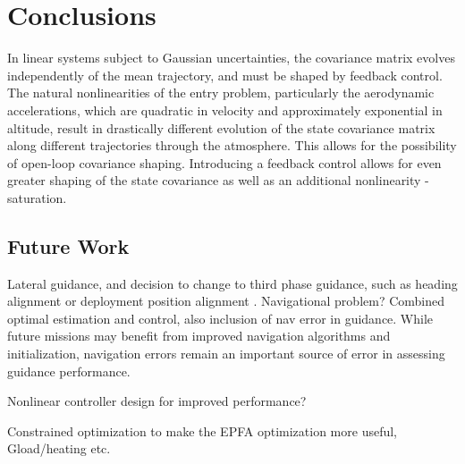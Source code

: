 \chapter{Conclusions}

In linear systems subject to Gaussian uncertainties, the covariance matrix evolves independently of the mean trajectory, and must be shaped by feedback control. The natural nonlinearities of the entry problem, particularly the aerodynamic accelerations, which are quadratic in velocity and approximately exponential in altitude, result in drastically different evolution of the state covariance matrix along different trajectories through the atmosphere. This allows for the possibility of open-loop covariance shaping. Introducing a feedback control allows for even greater shaping of the state covariance as well as an additional nonlinearity - saturation. 

\section{Future Work}
Lateral guidance, and decision to change to third phase guidance, such as heading alignment or deployment position alignment \cite{GuangfeiDissertation}.
Navigational problem? Combined optimal estimation and control, also inclusion of nav error in guidance. While future missions may benefit from improved navigation algorithms and initialization, navigation errors remain an important source of error in assessing guidance performance. 

Nonlinear controller design for improved performance? 

Constrained optimization to make the EPFA optimization more useful, Gload/heating etc. 


